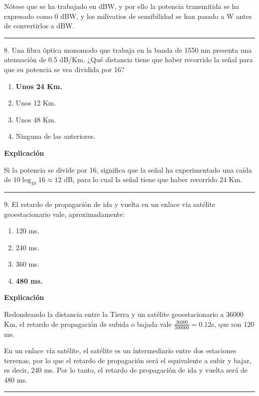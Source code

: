\documentclass[10pt,a4paper]{article}
\begin{document}
Nótese que se ha trabajado en dBW, y por ello la potencia transmitida se ha expresado como 0 dBW, y los milivatios de sensibilidad se han pasado a W antes de convertirlos a dBW.

\vspace{15pt} \hrule \vspace{15pt}

8. Una fibra óptica monomodo que trabaja en la banda de 1550 nm presenta una atenuación de 0.5 dB/Km. ¿Qué distancia tiene que haber recorrido la señal para que su potencia se vea dividida por 16?

\begin{enumerate}[label=\alph*]
    \item \textbf{Unos 24 Km.}
    \item Unos 12 Km.
    \item Unos 48 Km.
    \item Ninguna de las anteriores.
\end{enumerate}
\textbf{Explicación}

Si la potencia se divide por 16, significa que la señal ha experimentado una caída de $10\log_{10}{16} \approx 12$ dB, para lo cual la señal tiene que haber recorrido 24 Km.

\vspace{15pt} \hrule \vspace{15pt}

9. El retardo de propagación de ida y vuelta en un enlace vía satélite geoestacionario vale, aproximadamente:

\begin{enumerate}[label=\alph*]
    \item 120 ms.
    \item 240 ms.
    \item 360 ms.
    \item \textbf{480 ms.}
\end{enumerate}
\textbf{Explicación}

Redondeando la distancia entre la Tierra y un satélite geoestacionario a 36000 Km, el retardo de propagación de subida o bajada vale $\frac{36000}{300000} = 0.12$s, que son 120 ms.

En un enlace vía satélite, el satélite es un intermediario entre dos estaciones terrenas, por lo que el retardo de propagación será el equivalente a subir y bajar, es decir, 240 ms. Por lo tanto, el retardo de propagación de ida y vuelta será de 480 ms.

\vspace{15pt} \hrule \vspace{15pt}
\end{document}
